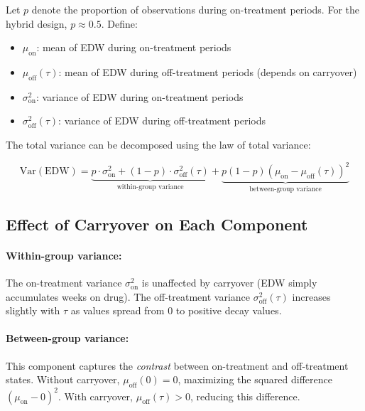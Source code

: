 \documentclass[11pt,letterpaper]{article}
\begin{document}
Let $p$ denote the proportion of observations during on-treatment periods.
For the hybrid design, $p \approx 0.5$. Define:

\begin{itemize}
    \item $\mu_{\text{on}}$: mean of EDW during on-treatment periods
    \item $\mu_{\text{off}}(\tau)$: mean of EDW during off-treatment periods
          (depends on carryover)
    \item $\sigma^2_{\text{on}}$: variance of EDW during on-treatment periods
    \item $\sigma^2_{\text{off}}(\tau)$: variance of EDW during off-treatment
          periods
\end{itemize}

The total variance can be decomposed using the law of total variance:

\begin{equation}
\text{Var}(\text{EDW}) = \underbrace{p \cdot \sigma^2_{\text{on}} +
(1-p) \cdot \sigma^2_{\text{off}}(\tau)}_{\text{within-group variance}} +
\underbrace{p(1-p)(\mu_{\text{on}} - \mu_{\text{off}}(\tau))^2}_{
\text{between-group variance}}
\label{eq:var_decomp}
\end{equation}

\subsection{Effect of Carryover on Each Component}

\paragraph{Within-group variance:}
The on-treatment variance $\sigma^2_{\text{on}}$ is unaffected by carryover
(EDW simply accumulates weeks on drug). The off-treatment variance
$\sigma^2_{\text{off}}(\tau)$ increases slightly with $\tau$ as values spread
from 0 to positive decay values.

\paragraph{Between-group variance:}
This component captures the \emph{contrast} between on-treatment and
off-treatment states. Without carryover, $\mu_{\text{off}}(0) = 0$,
maximizing the squared difference $(\mu_{\text{on}} - 0)^2$. With carryover,
$\mu_{\text{off}}(\tau) > 0$, reducing this difference.
\end{document}
